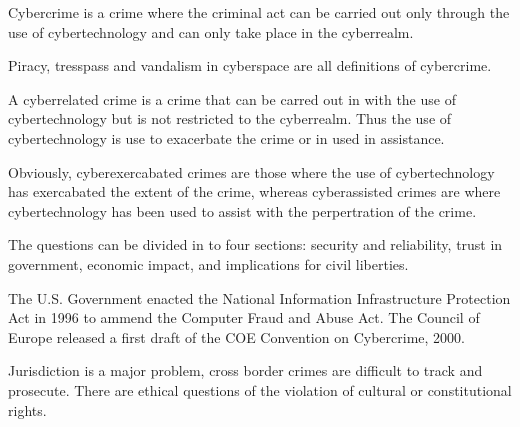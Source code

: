 
Cybercrime is a crime where the criminal act can be carried out only through the use of cybertechnology and can only take place in the cyberrealm.

Piracy, tresspass and vandalism in cyberspace are all definitions of cybercrime.




A cyberrelated crime is a crime that can be carred out in with the use of cybertechnology but is not restricted to the cyberrealm. Thus the use of cybertechnology is use to exacerbate the crime or in used in assistance.



Obviously, cyberexercabated crimes are those where the use of cybertechnology has exercabated the extent of the crime, whereas cyberassisted crimes are where cybertechnology has been used to assist with the perpertration of the crime.



The questions can be divided in to four sections: security and reliability, trust in government, economic impact, and implications for civil liberties.



The U.S. Government enacted the National Information Infrastructure Protection Act in 1996 to ammend the Computer Fraud and Abuse Act. The Council of Europe released a first draft of the COE Convention on Cybercrime, 2000.



Jurisdiction is a major problem, cross border crimes are difficult to track and prosecute. There are ethical questions of the violation of cultural or constitutional rights.

